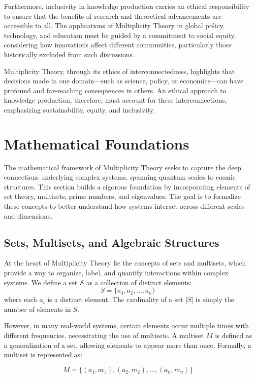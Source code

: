 \documentclass[12pt]{article}
\begin{document}
Furthermore, inclusivity in knowledge production carries an ethical responsibility to ensure that the benefits of research and theoretical advancements are accessible to all. The applications of Multiplicity Theory in global policy, technology, and education must be guided by a commitment to social equity, considering how innovations affect different communities, particularly those historically excluded from such discussions.

Multiplicity Theory, through its ethics of interconnectedness, highlights that decisions made in one domain—such as science, policy, or economics—can have profound and far-reaching consequences in others. An ethical approach to knowledge production, therefore, must account for these interconnections, emphasizing sustainability, equity, and inclusivity.


\section{Mathematical Foundations}

The mathematical framework of Multiplicity Theory seeks to capture the deep connections underlying complex systems, spanning quantum scales to cosmic structures. This section builds a rigorous foundation by incorporating elements of set theory, multisets, prime numbers, and eigenvalues. The goal is to formalize these concepts to better understand how systems interact across different scales and dimensions.

\subsection{Sets, Multisets, and Algebraic Structures}

At the heart of Multiplicity Theory lie the concepts of sets and multisets, which provide a way to organize, label, and quantify interactions within complex systems. We define a set \( S \) as a collection of distinct elements:
$$S = \{a_1, a_2, \dots, a_n\}$$
where each \( a_i \) is a distinct element. The cardinality of a set \( |S| \) is simply the number of elements in \( S \).

However, in many real-world systems, certain elements occur multiple times with different frequencies, necessitating the use of multisets. A multiset \( M \) is defined as a generalization of a set, allowing elements to appear more than once. Formally, a multiset is represented as:

$$M = \{(a_1, m_1), (a_2, m_2), \dots, (a_n, m_n)\}$$
\end{document}
